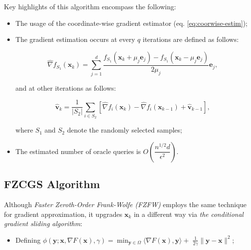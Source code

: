 \begin{multicols}{2}
Key highlights of this algorithm encompass the following:

\begin{itemize}[left=0pt,labelindent=0pt]
    
\item The usage of the coordinate-wise gradient estimator (eq. \eqref{eq:coorwise-estim});

\item The gradient estimation occurs at every $q$ iterations are defined as follows:

\small{
\begin{equation}
    \hat{\nabla} f_{S_1}\left(\mathbf{x}_k\right)=\sum_{j=1}^d \frac{f_{S_1}\left(\mathbf{x}_k+\mu_j \mathbf{e}_j\right)-f_{S_1}\left(\mathbf{x}_k-\mu_j \mathbf{e}_j\right)}{2 \mu_j} \mathbf{e}_j,
\label{eq:estim-grad-q}
\end{equation}
}

and at other iterations as follows:

\small{
\begin{equation}
    \hat{\mathbf{v}}_k=\frac{1}{\left|S_2\right|} \sum_{i \in S_2}\left[\hat{\nabla} f_i\left(\mathbf{x}_k\right)-\hat{\nabla} f_i\left(\mathbf{x}_{k-1}\right)+\hat{\mathbf{v}}_{k-1}\right],
\label{eq:estim-grad-not-q}
\end{equation}
}

where $S_1$ and $S_2$ denote the randomly selected samples;
    
\item The estimated number of oracle queries is $O\left(\dfrac{n^{1/2}d}{\epsilon^2}\right)$.
\end{itemize}


\subsection{FZCGS Algorithm}

Although \textit{Faster Zeroth-Order Frank-Wolfe (FZFW)} employs the 
same technique for gradient approximation, it upgrades $\mathbf{x}_{k}$
in a different way via \textit{the conditional gradient sliding algorithm}:

\begin{itemize}[left=0pt,labelindent=0pt]

\item Defining $\phi(\mathbf{y} ; \mathbf{x}, \nabla F(\mathbf{x}), \gamma)=\min _{\mathbf{y} \in \Omega}\langle\nabla F(\mathbf{x}), \mathbf{y}\rangle+$ $\frac{1}{2 \gamma}\|\mathbf{y}-\mathbf{x}\|^2$;


\end{itemize}
\end{multicols}
